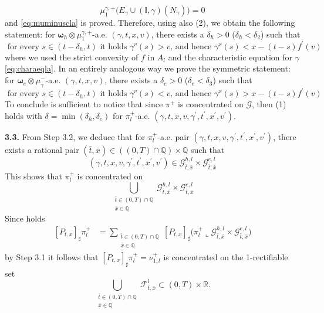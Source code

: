 \documentclass[11pt, twoside, reqno]{amsart}
\theoremstyle{definition}
\theoremstyle{remark}
\numberwithin{equation}{section}
\newcommand{\mc}[1]{\mathcal{#1}}
\newcommand{\bs}[1]{\boldsymbol{#1}}
\newcommand{\msc}[1]{\mathscr{#1}}
\begin{document}
$$
\mu_1^{\gamma,+} \big( E_{\gamma} \cup (\mathbb I, \gamma)(N_{\gamma})\big) = 0
$$
and \eqref{eq:muminuscla} is proved. Therefore, using also (2), we obtain the following statement: for $\bs \omega_h \otimes \mu_1^{\gamma,+}$-a.e. $(\gamma, t, x, v)$, there exists a $\delta_h> 0$ ($\delta_h < \delta_2$)  such that 
\begin{equation}
    \text{ for every $s \in (t-\delta_h, t)$ it holds $\gamma^v(s) > v$, and hence $\gamma^x(s) < x-(t-s) f^{\prime}(v)$ } 
\end{equation}
where we used the strict convexity of $f$ in $A_l$ and the characteristic equation for $\gamma$ \eqref{eq:charaeqla}. In an entirely analogous way we prove the symmetric statement: for $\bs \omega_e \otimes \mu_{\gamma}^-$-a.e. $(\gamma, t, x, v)$, there exists a $\delta_e> 0$ ($\delta_e < \delta_3$) such that 
\begin{equation}
    \text{ for every $s \in (t-\delta_h, t)$ it holds $\gamma^v(s) < v$, and hence $\gamma^x(s) > x-(t-s) f^{\prime}(v)$ } 
\end{equation} 
To conclude is sufficient to notice that since $\pi^+$ is concentrated on $\mc G$, then (1) holds with $\delta = \min (\delta_h, \delta_e)$ for $\pi^+_l$-a.e. $(\gamma, t, x, v, \gamma^{\prime}, t^{\prime}, x^{\prime}, v^{\prime})$.




\vspace{0.5cm}
\textbf{3.3.} From Step 3.2, we deduce that for $\pi^+_l$-a.e. pair $(\gamma, t, x, v, \gamma^{\prime}, t^{\prime}, x^{\prime}, v^{\prime})$, there exists a rational pair $(\bar t, \bar x) \in ((0, T) \cap \mathbb Q) \times \mathbb Q$ such that 
$$
(\gamma, t, x, v, \gamma^{\prime}, t^{\prime}, x^{\prime}, v^{\prime}) \in \mc G^{h,l}_{\bar t, \bar x} \times \mc G^{e,l}_{\bar t, \bar x} 
$$
This shows that $\pi^+_l$ is concentrated on 
$$
\bigcup_{\substack{\bar t \in (0, T) \cap \mathbb Q \\ \bar x \in \mathbb Q}} \mc G^{h,l}_{\bar t, \bar x} \times \mc G^{e,l}_{\bar t, \bar x} 
$$
Since holds
\begin{equation}
    \begin{aligned}
          [P_{t,x}]_{\sharp} \pi^+_l&  = \sum_{\substack{\bar t \in (0, T) \cap \mathbb Q \\ \bar x \in \mathbb Q}} [P_{t,x}]_{\sharp} \Big( \pi^+_l \llcorner \mc G^{h,l}_{\bar t, \bar x} \times \mc G^{e,l}_{\bar t, \bar x} \Big)
    \end{aligned}
\end{equation}
by Step 3.1 it follows that $[P_{t,x}]_{\sharp} \pi^+_l = \nu_{1,l}^+$ is concentrated on the 1-rectifiable set 
$$
\bigcup_{\substack{\bar t \in (0, T) \cap \mathbb Q \\ \bar x \in \mathbb Q}} \msc F^l_{\bar t, \bar x} \subset (0, T) \times \mathbb R.
$$
\end{document}
